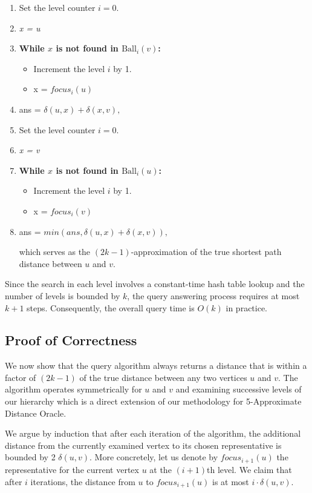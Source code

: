 \documentclass{article}
\begin{document}
\begin{enumerate}
    
    \item Set the level counter \(i = 0\).
    \item \textit{x = u}
    \item \textbf{While \(x\) is not found in \(\text{Ball}_i(v)\):}  
    \begin{itemize}
        \item Increment the level \(i\) by 1.
        \item x = \(focus_i(u)\)
    \end{itemize}
    \item ans =
    \(
    \delta(u, x) + \delta(x, v),
    \)

    \item Set the level counter \(i = 0\).
    \item \textit{x = v}
    \item \textbf{While \(x\) is not found in \(\text{Ball}_i(u)\):}  
    \begin{itemize}
        \item Increment the level \(i\) by 1.
        \item x = \(focus_i(v)\)
    \end{itemize}
    \item ans =
    \(
    min(ans, \delta(u, x) + \delta(x, v)),
    \)
    
    which serves as the \((2k-1)\)-approximation of the true shortest path distance between \(u\) and \(v\).
\end{enumerate}

Since the search in each level involves a constant-time hash table lookup and the number of levels is bounded by \(k\), the query answering process requires at most \(k+1\) steps.  Consequently, the overall query time is \(O(k)\) in practice.

\subsection{Proof of Correctness}

We now show that the query algorithm always returns a distance that is within a factor of \((2k-1)\) of the true distance between any two vertices \(u\) and \(v\). The algorithm operates symmetrically for \(u\) and \(v\) and examining successive levels of our hierarchy which is a direct extension of our methodology for 5-Approximate Distance Oracle.

We argue by induction that after each iteration of the algorithm, the additional distance from the currently examined vertex to its chosen representative is bounded by 2 \(\delta(u,v)\). More concretely, let us denote by \(focus_{i+1}(u)\) the representative for the current vertex \(u\) at the \((i+1)\)th level. We claim that after \(i\) iterations, the distance from \(u\) to \(focus_{i+1}(u)\) is at most \(i \cdot \delta(u,v)\).
\end{document}
